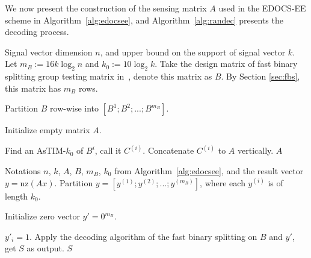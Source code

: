 \documentclass{article}
\newcommand{\nz}{\mathrm{nz}}
\begin{document}
We now present the construction of the sensing matrix $A$ used in the EDOCS-EE scheme in Algorithm~\ref{alg:edocsee}, and 
Algorithm~\ref{alg:randec} presents the decoding process. 

\begin{algorithm}[!]
\caption{EDOCS-EE: Sensing matrix \label{alg:edocsee}}
\begin{algorithmic}[1]
    \Require Signal vector dimension $n$, and upper bound on the support of signal vector $k$. Let $m_B:=16k\log_2 n$ and $k_0:=10\log_2 k$.
    \State Take the design matrix of fast binary splitting group testing matrix in~\cite{wang2023quickly}, denote this matrix as $B$. By Section \ref{sec:fbs}, this matrix has $m_B$ rows. 
    
    \State Partition $B$ row-wise into $[B^1;B^2;...;B^{m_B}]$.

    \State Initialize empty matrix $A$. 
    
    \State Find an AsTIM-$k_0$ of $B^i$, call it $C^{(i)}$.
    \State Concatenate $C^{(i)}$ to $A$ vertically.  
    \EndFor
    \State \Return $A$
\end{algorithmic}
\end{algorithm}


\begin{algorithm}[!]
\caption{EDOCS-EE: Decoding algorithm \label{alg:randec}}
\begin{algorithmic}[1]
    \Require Notations $n$, $k$, $A$,  $B$, $m_B$, $k_0$ from Algorithm~\ref{alg:edocsee}, and the result vector $y=\nz(Ax)$.
    \State Partition $y=[y^{(1)};y^{(2)};...;y^{(m_B)}]$, where each $y^{(i)}$ is of length $k_0$. 
    
    \State Initialize zero vector $y'=0^{m_B}$. 
    
     \State $y'_i=1$.
    \EndIf
    \EndFor
    \State Apply the decoding algorithm of the fast binary splitting on $B$ and $y'$, get $S$ as output. 
    \State \Return $S$
\end{algorithmic}
\end{algorithm}
\end{document}

